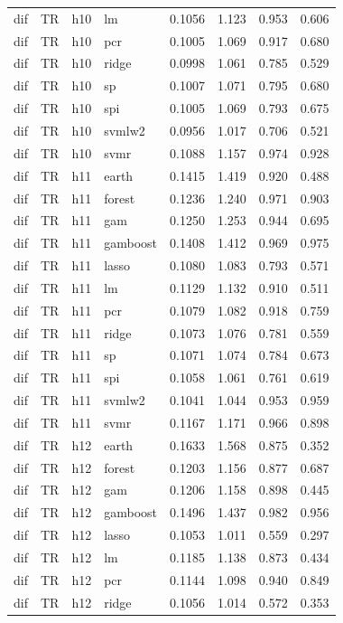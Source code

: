 \begin{ThreePartTable}
\begin{longtable}[t]{llclcccc}
dif & TR & h10 & lm & 0.1056 & 1.123 & 0.953 & 0.606\\
dif & TR & h10 & pcr & 0.1005 & 1.069 & 0.917 & 0.680\\
dif & TR & h10 & ridge & 0.0998 & 1.061 & 0.785 & 0.529\\
dif & TR & h10 & sp & 0.1007 & 1.071 & 0.795 & 0.680\\
dif & TR & h10 & spi & 0.1005 & 1.069 & 0.793 & 0.675\\
dif & TR & h10 & svmlw2 & 0.0956 & 1.017 & 0.706 & 0.521\\
dif & TR & h10 & svmr & 0.1088 & 1.157 & 0.974 & 0.928\\
\addlinespace
dif & TR & h11 & earth & 0.1415 & 1.419 & 0.920 & 0.488\\
dif & TR & h11 & forest & 0.1236 & 1.240 & 0.971 & 0.903\\
dif & TR & h11 & gam & 0.1250 & 1.253 & 0.944 & 0.695\\
dif & TR & h11 & gamboost & 0.1408 & 1.412 & 0.969 & 0.975\\
dif & TR & h11 & lasso & 0.1080 & 1.083 & 0.793 & 0.571\\
dif & TR & h11 & lm & 0.1129 & 1.132 & 0.910 & 0.511\\
dif & TR & h11 & pcr & 0.1079 & 1.082 & 0.918 & 0.759\\
dif & TR & h11 & ridge & 0.1073 & 1.076 & 0.781 & 0.559\\
dif & TR & h11 & sp & 0.1071 & 1.074 & 0.784 & 0.673\\
dif & TR & h11 & spi & 0.1058 & 1.061 & 0.761 & 0.619\\
dif & TR & h11 & svmlw2 & 0.1041 & 1.044 & 0.953 & 0.959\\
dif & TR & h11 & svmr & 0.1167 & 1.171 & 0.966 & 0.898\\
\addlinespace
dif & TR & h12 & earth & 0.1633 & 1.568 & 0.875 & 0.352\\
dif & TR & h12 & forest & 0.1203 & 1.156 & 0.877 & 0.687\\
dif & TR & h12 & gam & 0.1206 & 1.158 & 0.898 & 0.445\\
dif & TR & h12 & gamboost & 0.1496 & 1.437 & 0.982 & 0.956\\
dif & TR & h12 & lasso & 0.1053 & 1.011 & 0.559 & 0.297\\
dif & TR & h12 & lm & 0.1185 & 1.138 & 0.873 & 0.434\\
dif & TR & h12 & pcr & 0.1144 & 1.098 & 0.940 & 0.849\\
dif & TR & h12 & ridge & 0.1056 & 1.014 & 0.572 & 0.353\\

\end{longtable}
\end{ThreePartTable}
